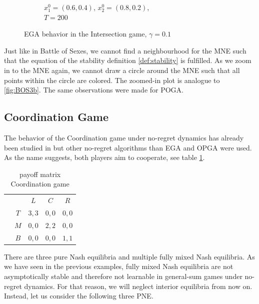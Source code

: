 \begin{figure}[H]
\begin{subfigure}{.5\textwidth}
    \caption{$x_{1}^0 = (0.6,0.4)$, $x_{2}^0 = (0.8,0.2)$, \\ $T = 200$}
    \label{fig:IntersectionGame1b}
\end{subfigure}
\caption{EGA behavior in the Intersection game, $\gamma = 0.1$}
\label{fig:IntersectionGame1}
\end{figure}


Just like in Battle of Sexes, we cannot find a neighbourhood for the MNE such that the equation of the stability definition \ref{def:stability} is fulfilled. As we zoom in to the MNE again, we cannot draw a circle around the MNE such that all points within the circle are colored. The zoomed-in plot is analogue to \ref{fig:BOS3b}. The same observations were made for POGA. 


\subsection{Coordination Game}\label{subsection:coordinationGame}

The behavior of the Coordination game under no-regret dynamics has already been studied in \cite{jafari} but other no-regret algorithms than EGA and OPGA were used. As the name suggests, both players aim to cooperate, see table \ref{tab:payoffCoordination3x3}.  \\

\begin{table}[H]\centering
\setlength{\extrarowheight}{2pt}
\begin{tabular}{cc|c|c|c|}
  & \multicolumn{1}{c}{} & \multicolumn{1}{c}{$L$}  & \multicolumn{1}{c}{$C$}  & \multicolumn{1}{c}{$R$} \\\cline{3-5}
            & $T$ & $3,3$ & $0,0$ & $0,0$ \\ \cline{3-5}
            & $M$ & $0,0$ & $2,2$ & $0,0$ \\\cline{3-5}
            & $B$ & $0,0$ & $0,0$ & $1,1$ \\\cline{3-5}
\end{tabular}\caption{\label{tab:payoffCoordination3x3}payoff matrix Coordination game}
\end{table}

There are three pure Nash equilibria and multiple fully mixed Nash equilibria. As we have seen in the previous examples, fully mixed Nash equilibria are not asymptotically stable and therefore not learnable in general-sum games under no-regret dynamics. For that reason, we will neglect interior equilibria from now on. Instead, let us consider the following three PNE.

